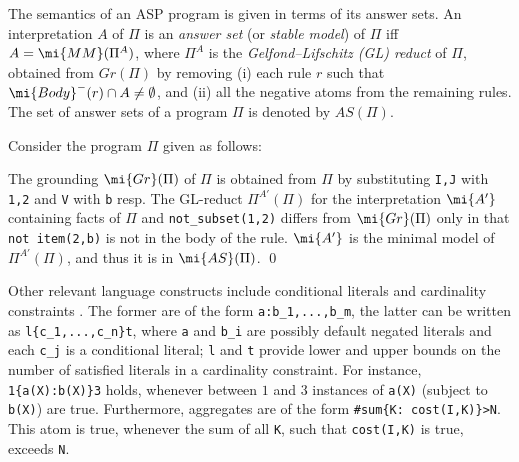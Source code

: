 The semantics of an ASP program is given in terms of its answer sets. An interpretation $A$ of $\Pi$ is an \emph{answer set} (or \emph{stable model}) of $\Pi$ iff $A = \mi{MM}(\Pi^A)$, where $\Pi^A$ is the \emph{Gelfond--Lifschitz (GL) reduct} \parencite{GL1988} of $\Pi$, obtained from $Gr(\Pi)$ by removing (i) each rule $r$ such that $\mi{Body}^-(r) \cap A\neq\emptyset$, and (ii) all the negative atoms from the remaining rules. The set of answer sets of a program $\Pi$ is denoted by $AS(\Pi)$.

\begin{example}
    Consider the program $\Pi$ given as follows:
    \smallskip

    \small{}
\smallskip

    \normalsize{The grounding $\mi{Gr}(\Pi)$ of $\Pi$ is obtained from $\Pi$ by  substituting \texttt{I,J} with \texttt{1,2} and \texttt{V} with \texttt{b} resp.
    The GL-reduct $\Pi^{A'}(\Pi)$ for the interpretation $\mi{A'}$ containing facts of $\Pi$ and \texttt{not\_subset(1,2)} differs from $\mi{Gr}(\Pi)$ only in that \texttt{not\,item(2,b)} is not in the body of the rule. $\mi{A'}$ is the %
    minimal model of $\Pi^{A'}(\Pi)$, and thus it is in $\mi{AS}(\Pi)$. \qed}
\end{example}


Other relevant language constructs include conditional literals and cardinality constraints \parencite{DBLP:journals/ai/SimonsNS02}. The former are of the form \texttt{a:b\_1,...,b\_m}, the latter
can be written as \texttt{l\{c\_1,...,c\_n\}t}, where \texttt{a} and \texttt{b\_i} are possibly default negated literals and each \texttt{c\_j} is a conditional literal; \texttt{l} and \texttt{t} provide lower and upper bounds on the number of satisfied literals in a cardinality constraint. For instance, \texttt{1\{a(X):b(X)\}3} holds, whenever between $1$ and $3$ instances of \texttt{a(X)} (subject to \texttt{b(X)}) are true. Furthermore, aggregates are of the form \texttt{\#sum\{K: cost(I,K)\}>N}. This atom is true, whenever the sum of all \texttt{K}, such that \texttt{cost(I,K)} is true, exceeds \texttt{N}.





